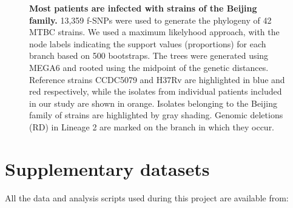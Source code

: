 \documentclass[12pt, oneside]{article}   	%
\begin{document}
\begin{figure}
\label{fig:supfig11}
\centering
{}
\caption{\textbf{Most patients are infected with strains of the Beijing family.} 13,359 f-SNPs were used to generate the phylogeny of 42 MTBC strains. We used a maximum likelyhood approach, with the node labels indicating the support values (proportions) for each branch based on 500 bootstraps. The trees were generated using MEGA6 \cite{MEGA} and rooted using the midpoint of the genetic distances. Reference strains CCDC5079 and H37Rv are highlighted in blue and red respectively, while the isolates from individual patients included in our study are shown in orange. Isolates belonging to the Beijing family of strains are highlighted by gray shading. Genomic deletions (RD) in Lineage 2 are marked on the branch in which they occur.}
\end{figure}

\newpage

\section{Supplementary datasets}
All the data and analysis scripts used during this project are available from:
\end{document}
